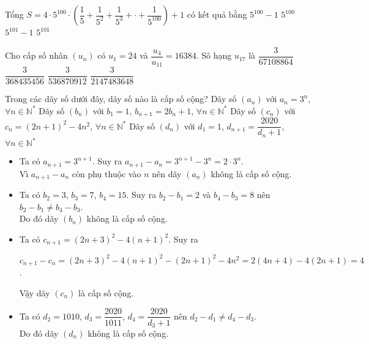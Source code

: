 \begin{ex}%
Tổng $ S=4\cdot 5^{100}\cdot \left(\dfrac{1}{5}+ \dfrac{1}{5^2}+\dfrac{1}{5^3}+\cdot +\dfrac{1}{5^{100}}\right)+1$ có kết quả bằng
\choice
{$ 5^{100}-1 $}
{\True $ 5^{100} $}
{$ 5^{101}-1 $}
{$ 5^{101} $}
\end{ex}

\begin{ex}%
Cho cấp số nhân $ (u_n) $ có $ u_1=24 $ và $ \dfrac{u_4}{u_{11}}=16384 $. Sô hạng $ u_{17} $ là
\choice
{$ \dfrac{3}{67108864} $}
{$ \dfrac{3}{368435456} $}
{\True $ \dfrac{3}{536870912} $}
{$ \dfrac{3}{2147483648} $}
\end{ex}

\begin{ex}%
Trong các dãy số dưới đây, dãy số nào là cấp số cộng?
\choice
{Dãy số $(a_n)$ với $a_n=3^n$, $ \forall n \in \mathbb{N}^*$}
{Dãy số $(b_n)$ với $b_1=1$, $b_{n+1}=2b_n+1$, $ \forall n \in \mathbb{N}^*$}
{\True Dãy số $(c_n)$ với $c_n=(2n+1)^2-4n^2$, $ \forall n \in \mathbb{N}^*$}
{Dãy số $(d_n)$ với $d_1=1$, $d_{n+1}=\dfrac{2020}{d_n+1}$, $ \forall n \in \mathbb{N}^*$}
\loigiai
{\begin{itemize}
\item Ta có $a_{n+1}=3^{n+1}$. Suy ra $a_{n+1}-a_n=3^{n+1}-3^n=2\cdot 3^n$.\\
Vì $a_{n+1}-a_n$ còn phụ thuộc vào $n$ nên dãy $(a_n)$ không là cấp số cộng.
\item Ta có $b_2=3$, $b_3=7$, $b_4=15$. Suy ra $b_2-b_1=2$ và $b_4-b_3=8$ nên $b_2-b_1\neq b_4-b_3$.\\
Do đó dãy $(b_n)$ không là cấp số cộng.
\item Ta có $c_{n+1}=(2n+3)^2-4(n+1)^2$. Suy ra
\begin{center}
$c_{n+1}-c_n=(2n+3)^2-4(n+1)^2-(2n+1)^2-4n^2=2(4n+4)-4(2n+1)=4$.
\end{center}
Vậy dãy $(c_n)$ là cấp số cộng.
\item Ta có $d_2=1010$, $d_3=\dfrac{2020}{1011}$, $d_4=\dfrac{2020}{d_3+1}$ nên $d_2-d_1\neq d_4-d_3$.\\
Do đó dãy $(d_n)$ không là cấp số cộng.
\end{itemize}
}
\end{ex}


